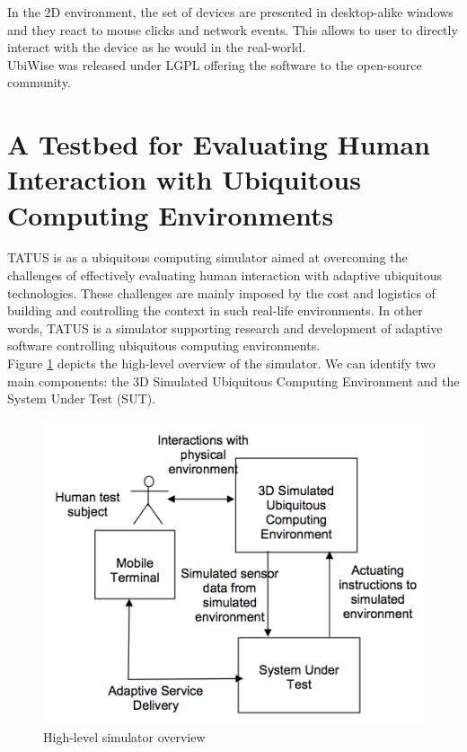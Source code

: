 In the 2D environment, the set of devices are presented in desktop-alike windows and they react to mouse clicks and network events. This allows to user to directly interact with the device as he would in the real-world.\\

UbiWise was released under LGPL\cite{lgpl} offering the software to the open-source community.\\

\section{A Testbed for Evaluating Human Interaction with Ubiquitous Computing Environments}\label{sec:tatus}

TATUS \cite{o2005testbed} is as a ubiquitous computing simulator aimed at overcoming the challenges of effectively evaluating human interaction with adaptive ubiquitous technologies. These challenges are mainly imposed by the cost and logistics of building and controlling the context in such real-life environments. In other words, TATUS is a simulator supporting research and development of adaptive software controlling ubiquitous computing environments.\\

Figure \ref{fig:tatus_overview} depicts the high-level overview of the simulator. We can identify two main components: the 3D Simulated Ubiquitous Computing Environment and the System Under Test (SUT).\\

\begin{figure}[H]
	\centering
	\includegraphics[width=\linewidth]{gfx/Chapter2/tatus_system_overview}
	\caption{High-level simulator overview}
	\label{fig:tatus_overview}
\end{figure}

